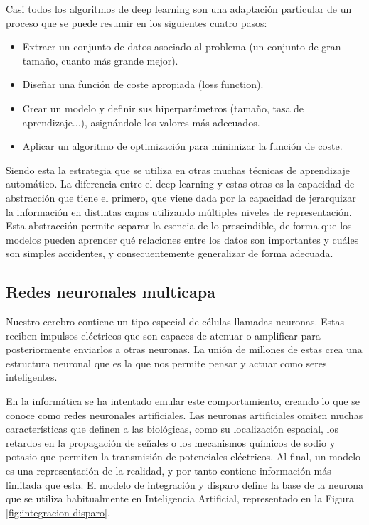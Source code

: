 Casi todos los algoritmos de deep learning son una adaptación particular de un proceso que se puede resumir en los siguientes cuatro pasos:

\begin{itemize}
    \item Extraer un conjunto de datos asociado al problema (un conjunto de gran tamaño, cuanto más grande mejor).
    \item Diseñar una función de coste apropiada (loss function).
    \item Crear un modelo y definir sus hiperparámetros (tamaño, tasa de aprendizaje...), asignándole los valores más adecuados.
    \item Aplicar un algoritmo de optimización para minimizar la función de coste.
\end{itemize}

Siendo esta la estrategia que se utiliza en otras muchas técnicas de aprendizaje automático. La diferencia entre el deep learning y estas otras es la capacidad de abstracción que tiene el primero, que viene dada por la capacidad de jerarquizar la información en distintas capas utilizando múltiples niveles de representación. Esta abstracción permite separar la esencia de lo prescindible, de forma que los modelos pueden aprender qué relaciones entre los datos son importantes y cuáles son simples accidentes, y consecuentemente generalizar de forma adecuada. \cite{berzal2018redes}

\subsection{Redes neuronales multicapa}
Nuestro cerebro contiene un tipo especial de células llamadas neuronas. Estas reciben impulsos eléctricos que son capaces de atenuar o amplificar para posteriormente enviarlos a otras neuronas. La unión de millones de estas crea una estructura neuronal que es la que nos permite pensar y actuar como seres inteligentes.

En la informática se ha intentado emular este comportamiento, creando lo que se conoce como redes neuronales artificiales. Las neuronas artificiales omiten muchas características que definen a las biológicas, como su localización espacial, los retardos en la propagación de señales o los mecanismos químicos de sodio y potasio que permiten la transmisión de potenciales eléctricos. Al final, un modelo es una representación de la realidad, y por tanto contiene información más limitada que esta. El modelo de integración y disparo define la base de la neurona que se utiliza habitualmente en Inteligencia Artificial, representado en la Figura \ref{fig:integracion-disparo}.

